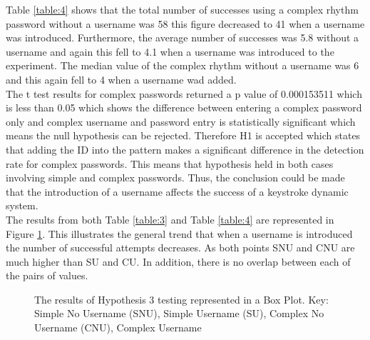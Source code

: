 \documentclass{article}
\begin{document}
Table \ref{table:4} shows that the total number of successes using a complex rhythm password without a username was 58 this figure decreased to 41 when a username was introduced. Furthermore, the average number of successes was 5.8 without a username and again this fell to 4.1 when a username was introduced to the experiment. The median value of the complex rhythm without a username was 6 and this again fell to 4 when a username wad added. \\

The t test results for complex passwords returned a p value of 0.000153511 which is less than 0.05 which shows the difference between entering a complex password only and complex username and password entry is statistically significant which means the null hypothesis can be rejected. Therefore H1 is accepted which states that adding the ID into the pattern makes a significant difference in the detection rate for complex passwords. This means that hypothesis held in both cases involving simple and complex passwords. Thus, the conclusion could be made that the introduction of a username affects the success of a keystroke dynamic system.  \\

The results from both Table \ref{table:3} and Table \ref{table:4} are represented in Figure \ref{fig:boxPlotHyp3}. This illustrates the general trend that when a username is introduced the number of successful attempts decreases. As both points SNU and CNU are much higher than SU and CU. In addition, there is no overlap between each of the pairs of values.   

\begin{figure} [H]
    \centering
    \caption{The results of Hypothesis 3 testing represented in a Box Plot. Key: Simple No Username (SNU), Simple Username (SU), Complex No Username (CNU), Complex Username}
    \label{fig:boxPlotHyp3}
\end{figure}
\end{document}
